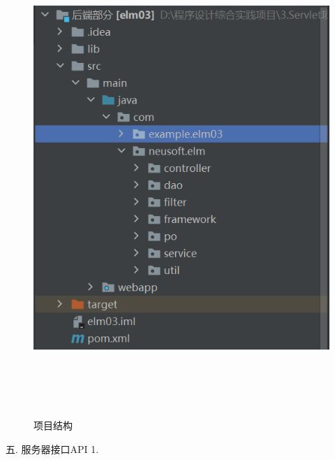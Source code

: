 \begin{figure}[H]
    \centering
    \includegraphics[width=15cm,height=18cm]{figures/structure3.png}
    \caption{项目结构}
\end{figure}

\noindent
五. 服务器接口API
1.


